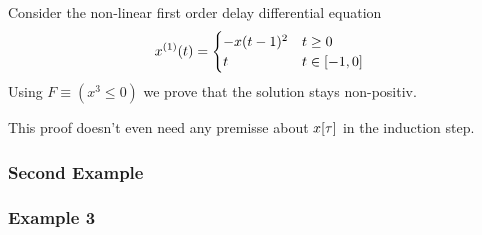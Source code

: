 \documentclass[10pt]{report}
\begin{document}
            Consider the non-linear first order delay differential equation
            \begin{equation}
                \D{x}(t) = \begin{cases}
                     -x(t-1)^2 & t \geq 0\\
                     t & t \in [-1,0]
                \end{cases}
            \end{equation}
            Using $F\equiv(x^3\leq 0)$ we prove that the solution stays non-positiv.
            \begin{sequentdeduction}
            \end{sequentdeduction}
            This proof doesn't even need any premisse about $x[\tau]$ in the induction step.
        \subsubsection{Second Example}
        \label{sec:second-example}

        \subsubsection{Example 3}
            \label{sec:ddi-example-3}
\end{document}
